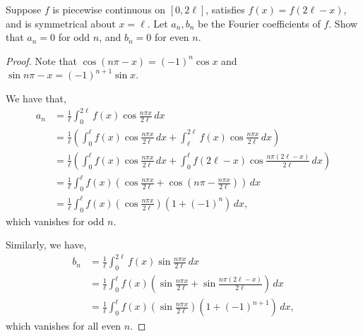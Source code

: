 \documentclass[../hw6]{subfiles}
\begin{document}
\begin{problem}
Suppose $f$ is piecewise continuous on  $[0,2\ell]$, satisfies $f(x)=f(2\ell-x)$, and is symmetrical about $x=\ell$.
Let $a_n,b_n$ be the Fourier coefficients of  $f$.
Show that  $a_n=0$ for odd $n$, and  $b_n=0$ for even $n$.
\end{problem}
\begin{proof}
	Note that $\cos{(n\pi - x)} = (-1)^n \cos{x}$ and $\sin{n \pi - x} = (-1)^{n+1}\sin{x} $.

	We have that,
	\begin{align*}
		a_n & = \frac{1}{\ell} \int_{0}^{2\ell}f(x)\cos{\frac{n \pi x}{2\ell}}   \,dx                                                                                      \\
		    & = \frac{1}{\ell}\left( \int_{0}^{\ell}f(x)\cos{\frac{n \pi x}{2\ell}} \,dx + \int_{\ell}^{2\ell} f(x)\cos{\frac{n \pi x}{2 \ell}} \,dx \right)               \\
		    & = \frac{1}{\ell} \left( \int_{0}^{\ell} f(x)\cos{\frac{n \pi x }{2\ell}}  \,dx + \int_{0}^{\ell} f(2\ell-x) \cos{\frac{n \pi (2\ell-x)}{2\ell}} \,dx \right) \\
		    & = \frac{1}{\ell}\int_{0}^{\ell} f(x)\left( \cos{\frac{n \pi x}{2\ell}}+ \cos{\left( n\pi - \frac{n \pi x}{2\ell} \right) }   \right)  \,dx                   \\
		    & = \frac{1}{\ell}\int_{0}^{\ell} f(x)\left( \cos{\frac{n\pi x}{2\ell}}  \right)(1+(-1)^n)  \,dx
		,\end{align*} which vanishes for odd $n$.

	Similarly, we have,
	\begin{align*}
		b_n & = \frac{1}{\ell}\int_{0}^{2\ell}f(x)\sin{\frac{n \pi x}{2\ell}}   \,dx                                                     \\
		    & = \frac{1}{\ell}\int_{0}^{\ell}f(x)\left( \sin{\frac{n \pi x}{2\ell}} + \sin{\frac{n \pi (2\ell-x)}{2\ell}} \right)   \,dx \\
		    & = \frac{1}{\ell}\int_{0}^{\ell}f(x)\left( \sin{\frac{n \pi x}{2\ell}} \right) (1+(-1)^{n+1})  \,dx
		,\end{align*} which vanishes for all even $n$.
\end{proof}
\end{document}
